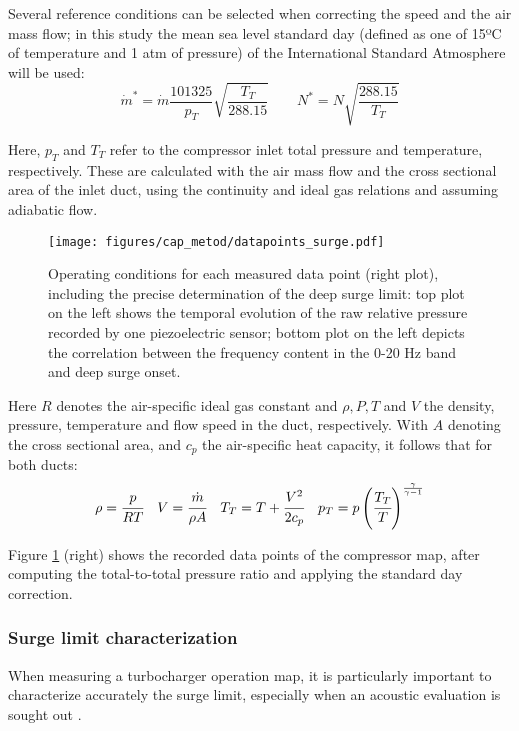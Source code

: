 Several reference conditions can be selected when correcting the speed and the air mass flow; in this study the mean sea level standard day (defined as one of 15ºC of temperature and 1 atm of pressure) of the International Standard Atmosphere will be used:
\begin{equation}
    \dot m^* = \dot m\frac{101325}{p_{T}}\sqrt{\frac{T_{T}}{288.15}}
    \qquad N^*=N\sqrt{\frac{288.15}{T_{T}}}
\end{equation}

Here, $p_{T}$ and $T_{T}$ refer to the compressor inlet total pressure and temperature, respectively. These are calculated with the air mass flow and the cross sectional area of the inlet duct, using the continuity and ideal gas relations and assuming adiabatic flow.

\begin{figure}[bth!]
\centering
\texttt{[image: figures/cap\_metod/datapoints\_surge.pdf]}
\caption{Operating conditions for each measured data point (right plot), including the precise determination of the deep surge limit: top plot on the left shows the temporal evolution of the raw relative pressure recorded by one piezoelectric sensor; bottom plot on the left depicts the correlation between the frequency content in the 0-20 Hz band and deep surge onset.}
\label{fig:surge_datapoints}
\end{figure}

Here $R$ denotes the air-specific ideal gas constant and $\rho,P,T$ and $V$ the density, pressure, temperature and flow speed in the duct, respectively. With $A$ denoting the cross sectional area, and $c_p$ the air-specific heat capacity, it follows that for both ducts:
\begin{equation}
    \rho =\cfrac{p}{RT} \quad
    V =\cfrac{\dot m}{\rho A} \quad
    T_{T}=T+\cfrac{V^2}{2c_p} \quad
    p_{T}=p\left(\cfrac{T_{T}}{T}\right)^\frac{\gamma}{\gamma-1}
\end{equation}

Figure \ref{fig:surge_datapoints} (right) shows the recorded data points of the compressor map, after computing the total-to-total pressure ratio and
applying the standard day correction.

\subsubsection{Surge limit characterization}
\label{sub:surge_limit_characterization}

When measuring a turbocharger operation map, it is particularly important to  characterize accurately the surge limit, especially when an acoustic evaluation is sought out \cite{galindo2006surge}.

